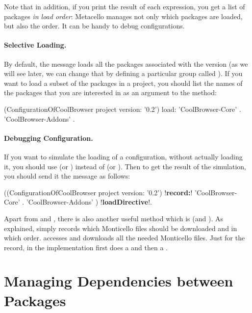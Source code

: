 \documentclass[a4paper,10pt,twoside]{book}
\begin{document}
Note that in addition, if you print the result of each expression, you get a list of packages \emph{in load order}: Metacello manages not only which packages are loaded, but also the order. It can be handy to debug configurations.

\paragraph{Selective Loading.} By default, the  message loads all the packages associated with the version (as we will see later, we can change that by defining a particular group called ). If you want to load a subset of the packages in a project, you should list
the names of the packages that you are interested in as an argument to the  method:

\begin{code}{}
  (ConfigurationOfCoolBrowser project version: '0.2') load:
  		{ 'CoolBrowser-Core' .
  		'CoolBrowser-Addons' }.
\end{code}


\paragraph{Debugging Configuration.}
If you want to simulate the loading of a configuration, without actually loading it, you should use  (or ) instead of  (or ). Then to get the result of the simulation, you should send it the message  as follows:

\begin{code}{}
  ((ConfigurationOfCoolBrowser project version: '0.2') !\textbf{record:}!
  		{ 'CoolBrowser-Core' .
		'CoolBrowser-Addons' }) !\textbf{loadDirective}!.
\end{code}

Apart from  and , there is also another useful method  which is  (and ). As explained,  simply records which Monticello files should be downloaded and in which order.   accesses and downloads all the needed Monticello files. Just for the record, in the implementation  first does a  and then a .

\section{Managing Dependencies between Packages}
\end{document}
